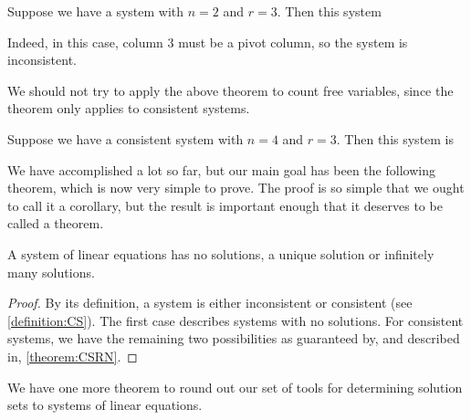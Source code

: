\documentclass{ximera}
\begin{document}
\begin{example}
  Suppose we have a system with $n=2$ and $r=3$.  Then this system
  \begin{multipleChoice}
  \end{multipleChoice}
  \begin{feedback}
    Indeed, in this case, column 3 must be a pivot column, so the
    system is inconsistent.

    We should not try to apply the above theorem to count free
    variables, since the theorem only applies to consistent
    systems.
  \end{feedback}
\end{example}

\begin{example}
  Suppose we have a consistent system with $n=4$ and $r=3$.  Then this system is
  \begin{multipleChoice}
  \end{multipleChoice}
\end{example}

We have accomplished a lot so far, but our main goal has been the
following theorem, which is now very simple to prove.  The proof is so
simple that we ought to call it a corollary, but the result is
important enough that it deserves to be called a theorem.

\begin{theorem}
\label{theorem:PSSLS}

A system of linear equations has no solutions, a unique solution or infinitely many solutions.

\begin{proof}
By its definition, a system is either inconsistent or consistent (see \ref{definition:CS}).  The first case describes systems with no solutions.  For consistent systems, we have the remaining two possibilities as guaranteed by, and described in, \ref{theorem:CSRN}.
\end{proof}
\end{theorem}

We have one more theorem to round out our set of tools for determining solution sets to systems of linear equations.
\end{document}

